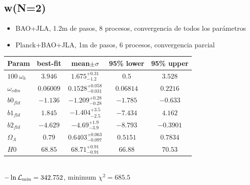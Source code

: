 \documentclass[a4paper,10pt]{article}
\begin{document}
\subsection{w(N=2)}

\begin{itemize}
 \item BAO+JLA, 1.2m de pasos, 8 procesos, convergencia de todos los parámetros
 \item Planck+BAO+JLA, 1m de pasos, 6 procesos, convergencia parcial
\end{itemize}

\begin{tabular}{|l|c|c|c|c|} 
 \hline 
Param & best-fit & mean$\pm\sigma$ & 95\% lower & 95\% upper \\ \hline 
$100~\omega_{b }$ &$3.946$ & $1.675_{-1.2}^{+0.31}$ & $0.5$ & $3.528$ \\ 
$\omega_{cdm }$ &$0.06009$ & $0.1528_{-0.031}^{+0.058}$ & $0.06814$ & $0.2216$ \\ 
$b0_{fld }$ &$-1.136$ & $-1.209_{-0.28}^{+0.28}$ & $-1.785$ & $-0.633$ \\ 
$b1_{fld }$ &$1.845$ & $-1.404_{-2.5}^{+3.5}$ & $-7.434$ & $4.162$ \\ 
$b2_{fld }$ &$-4.629$ & $-4.69_{-3.9}^{+1.9}$ & $-8.793$ & $-0.3901$ \\ 
$\Omega_{\Lambda }$ &$0.79$ & $0.6403_{-0.097}^{+0.063}$ & $0.5151$ & $0.7834$ \\ 
$H0$ &$68.85$ & $68.71_{-0.91}^{+0.91}$ & $66.88$ & $70.53$ \\ 
\hline 
 \end{tabular} \\ 
$-\ln{\cal L}_\mathrm{min} =342.752$, minimum $\chi^2=685.5$ \\ 
\end{document}

